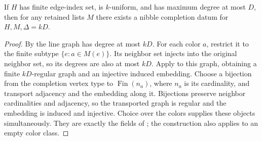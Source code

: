 \begin{lemma}
If $H$ has finite edge-index set, is $k$-uniform, and has maximum degree
at most $D$, then for any retained lists $M$ there exists a nibble
completion datum for $H,M,\Delta=kD$.
\end{lemma}
\begin{proof}
By  the line graph has degree
at most $kD$. For each color $a$, restrict it to the finite subtype
$\{e:a\in M(e)\}$. Its neighbor set injects into the original neighbor
set, so its degrees are also at most $kD$. Apply
 to this graph, obtaining a finite
$kD$-regular graph and an injective induced embedding. Choose a bijection
from the completion vertex type to $\operatorname{Fin}(n_a)$, where $n_a$
is its cardinality, and transport adjacency and the embedding along it.
Bijections preserve neighbor cardinalities and adjacency, so the transported
graph is regular and the embedding is induced and injective. Choice over
the colors supplies these objects simultaneously. They are exactly the
fields of ; the construction also applies
to an empty color class.
\end{proof}
